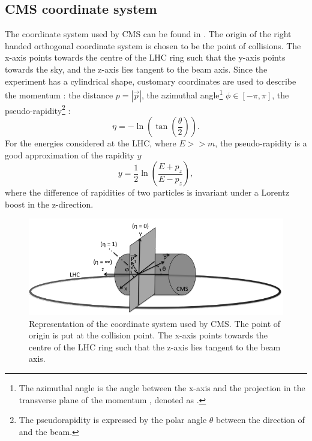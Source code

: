 \subsection{CMS coordinate system}
The coordinate system used by CMS can be found in . The origin of the right handed orthogonal coordinate system is chosen to be the point of collisions. The x-axis points towards the centre of the LHC ring such that the y-axis points towards the sky, and the z-axis lies tangent to the beam axis. Since the experiment has a cylindrical shape, customary coordinates are used to describe the momentum \impuls: the distance $p=|\vec{p}|$, the azimuthal angle\footnote{The azimuthal angle is the angle between the x-axis and the projection in the transverse plane of the momentum \impuls, denoted as \trimpuls. } $\phi \in \left[-\pi,\pi\right]$, the pseudo-rapidity\footnote{The pseudorapidity  is expressed by the polar angle $\theta$ between the direction of \impuls and the beam.} \psrap: 
\begin{equation}
\eta = - \ln \left(\tan \left(\frac{\theta}{2}\right)\right).
\end{equation}
For the energies considered at the LHC, where $E >> m$, the pseudo-rapidity is a good approximation of the rapidity $y$
\begin{equation}
y = \frac{1}{2} \ln \left(\frac{E + p_z}{E - p_z}\right), 
\end{equation}
where the difference of rapidities of two particles is invariant under a Lorentz boost in the z-direction.
 \begin{figure}[htbp]
	\centering
	\includegraphics[width=1.\linewidth]{2_ExperimentalSetup/Figures/imageedit_1_9146672677}
	\caption{Representation of the coordinate system used by CMS. The point of origin is put at the collision point. The x-axis points towards the centre of the LHC ring such that the z-axis lies tangent to the beam axis. }
	\label{fig:CMScoord}
\end{figure}
\newpage
